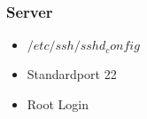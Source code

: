 \begin{frame}
\frametitle{Server}
\begin{itemize}
\item $/etc/ssh/sshd_config$
\item Standardport 22
\item Root Login
\end{itemize}
\end{frame}